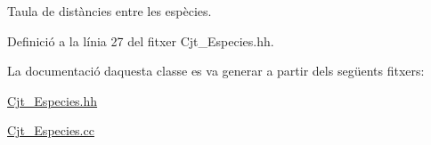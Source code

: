 Taula de distàncies entre les espècies. 



Definició a la línia 27 del fitxer Cjt\+\_\+\+Especies.\+hh.



La documentació d\textquotesingle{}aquesta classe es va generar a partir dels següents fitxers\+:\begin{DoxyCompactItemize}
\item 
\hyperlink{_cjt___especies_8hh}{Cjt\+\_\+\+Especies.\+hh}\item 
\hyperlink{_cjt___especies_8cc}{Cjt\+\_\+\+Especies.\+cc}\end{DoxyCompactItemize}
